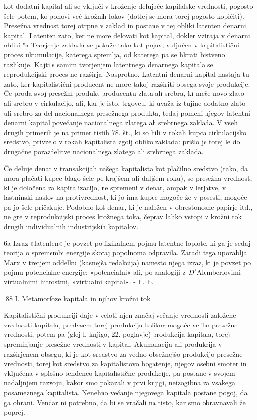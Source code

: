 \documentclass[kapital_02.tex]{subfiles}
\begin{document}
 kot dodatni kapital ali se vključi v kroženje delujoče kapilalske vrednosti, pogosto šele potem, ko ponovi več krožnih lokov (dotlej se mora torej pogosto kopičiti). Presežna vrednost torej otrpne v zaklad in postane v tej obliki latenten denarni kapital. Latenten zato, ker ne more delovati kot kapital, dokler vztraja v denarni obliki."a Tvorjenje zaklada se pokaže tako kot pojav, vključen v kapitalistični proces ukumulacije, katerega spremlja, od katerega pa se hkrati bistveno razlikuje. Kajti s samim tvorjenjem latentnega denarnega kapitala se reprodukcijski proces ne razširja. Nasprotno. Latentni denarni kapital nastaja tu zato, ker kapitalistični producent ne more takoj razširiti obsega svoje produkcije. Če proda svoj presežni produkt producentu zlata ali srebra, ki meče novo zlato ali srebro v cirkulacijo, ali, kar je isto, trgovcu, ki uvaža iz tujine dodatno zlato uli srebro za del nacionalnega presežnega produkta, tedaj pomeni njegov latentni denarni kapital povečanje nacionalnega zlatega ali srebrnega zaklada. V vseh drugih primerih je na primer tistih 78. št., ki so bili v rokah kupca cirkulacijsko sredstvo, privzelo v rokah kapitalista zgolj obliko zaklada: prišlo je torej le do drugačne porazdelitve nacionalnega zlatega ali srebrnega zaklada.

Če deluje denar v transakcijah našega kapitalista kot plačilno sredstvo (tako, da mora plačati kupec blago šele po krajšem ali daljšem roku), se presežna vrednost, ki je določena za kapitalizacijo, ne spremeni v denar, ampak v lerjatve, v lastninski naslov na protivrednost, ki jo ima kupec mogoče že v posesti, mogoče pa jo šele pričakuje. Podobno kot denar, ki je naložen v obrestonosne papirje itd., ne gre v reprodukcijski proces krožnega toka, čeprav lahko vstopi v krožni tok drugih individualnih industrijskih kapitalov.



 6a Izraz »latenten« je povzet po fizikalnem pojmu latentne loplote, ki ga je sedaj teorija o spremembi energije skoraj popolnoma odpravila. Zaradi tega uporablja Marx v tretjem oddelku (kasnejša redakcija) namesto njega izraz, ki je povzet po pojmu potencialne energije: »potencialni« ali, po analogiji z \( D' \)Alemberlovimi virtualnimi hitrostmi, »virtualni kapital«. - F. E.



88 I. Metamorfoze kapitala in njihov krožni tok



 Kapitalistični produkciji daje v celoti njen značaj večanje vrednosti založene vrednosti kapitala, predvsem torej produkcija kolikor mogoče veliko presežne vrednosti, potem pa (glej l. knjigo, 22. poglavje) produkcija kapitala, torej spreminjanje presežne vrednosti v kapital. Akumulacija ali produkcija v razširjenem obsegu, ki je kot sredstvo za vedno obsežnejšo produkcijo presežne vrednosti, torej kot sredstvo za kapitalistovo bogatenje, njegov osebni smoter in vključena v splošno tendenco kapitalistične produkcije, pa postane v svojem nadaljnjem razvoju, kakor smo pokazali v prvi knjigi, neizogibna za vsakega posameznega kapitalista. Nenehno večanje njegovega kapitala postane pogoj, da ga ohrani. Vendar ni potrebno, da bi se vračali na tisto, kar smo obravnavali že poprej.
\end{document}
